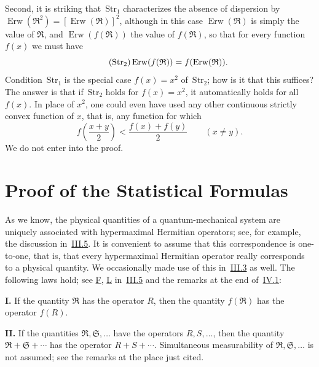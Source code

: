 \documentclass[fontsize=13pt,twoside,openany,headings=normal,parskip=false,bookmarkpackage=false,DIV=calc]{scrbook}
\begin{document}
Second, it is striking that~\hyperref[eq:IV.1.Str1]{$\mathrm{Str}_1$} characterizes the absence of dispersion by $\operatorname{Erw}(\mathfrak R^2)=[\operatorname{Erw}(\mathfrak R)]^2$, although in this case $\operatorname{Erw}(\mathfrak R)$ is simply the value of $\mathfrak R$, and $\operatorname{Erw}(f(\mathfrak R))$ the value of $f(\mathfrak R)$, so that for every function $f(x)$ we must have
\begin{equation}\tag{$\mathrm{Str}_2$}\label{eq:IV.1.Str2}
\operatorname{Erw}(f(\mathfrak R))=f(\operatorname{Erw}(\mathfrak R)).
\end{equation}
Condition~\hyperref[eq:IV.1.Str1]{$\mathrm{Str}_1$} is the special case $f(x)=x^2$ of~\hyperref[eq:IV.1.Str2]{$\mathrm{Str}_2$}; how is it that this suffices? The answer is that if~\hyperref[eq:IV.1.Str2]{$\mathrm{Str}_2$} holds for $f(x)=x^2$, it automatically holds for all $f(x)$. In place of $x^2$, one could even have used any other continuous strictly convex function of $x$, that is, any function for which
\[
f\left(\frac{x+y}{2}\right)<\frac{f(x)+f(y)}2\qquad(x\ne y).
\]
We do not enter into the proof.

\hypertarget{origpage-167}{}%
\section{Proof of the Statistical Formulas}\label{sec:IV.2}
As we know, the physical quantities of a quantum-mechanical system are uniquely associated with hypermaximal Hermitian operators; see, for example, the discussion in~\hyperref[sec:III.5]{III.5}. It is convenient to assume that this correspondence is one-to-one, that is, that every hypermaximal Hermitian operator really corresponds to a physical quantity. We occasionally made use of this in~\hyperref[sec:III.3]{III.3} as well. The following laws hold; see \hyperref[post:III.5.F]{F}, \hyperref[post:III.5.L]{L} in~\hyperref[sec:III.5]{III.5} and the remarks at the end of~\hyperref[sec:IV.1]{IV.1}:

\noindent{}\textbf{I.}\label{cond:IV.2.I} If the quantity $\mathfrak R$ has the operator $R$, then the quantity $f(\mathfrak R)$ has the operator $f(R)$.

\noindent{}\textbf{II.}\label{cond:IV.2.II} If the quantities $\mathfrak R,\mathfrak S,\ldots$ have the operators $R,S,\ldots$, then the quantity $\mathfrak R+\mathfrak S+\cdots$ has the operator $R+S+\cdots$. Simultaneous measurability of $\mathfrak R,\mathfrak S,\ldots$ is not assumed; see the remarks at the place just cited.
\end{document}
